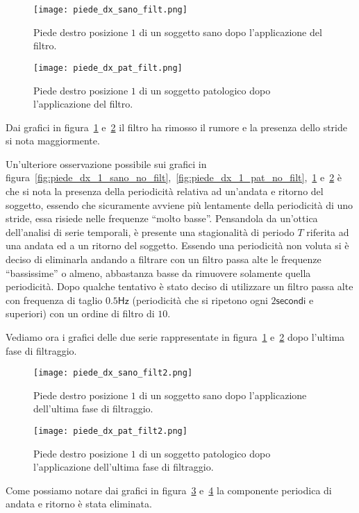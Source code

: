 \begin{figure}[H]
    \centering
    \texttt{[image: piede\_dx\_sano\_filt.png]}
    \caption{Piede destro posizione $1$ di un soggetto sano dopo l'applicazione del filtro.}
    \label{fig:piede_dx_1_sano_filt}
\end{figure}

\begin{figure}[H]
    \centering
    \texttt{[image: piede\_dx\_pat\_filt.png]}
    \caption{Piede destro posizione $1$ di un soggetto patologico dopo l'applicazione del filtro.}
    \label{fig:piede_dx_1_pat_filt}
\end{figure}

Dai grafici in figura~\ref{fig:piede_dx_1_sano_filt} 
e~\ref{fig:piede_dx_1_pat_filt} il filtro ha rimosso il rumore e la presenza dello stride
si nota maggiormente.

Un'ulteriore osservazione possibile sui grafici in figura~\ref{fig:piede_dx_1_sano_no_filt},~\ref{fig:piede_dx_1_pat_no_filt},~\ref{fig:piede_dx_1_sano_filt} 
e~\ref{fig:piede_dx_1_pat_filt} è che si nota la presenza della periodicità
relativa ad un'andata e ritorno del soggetto,
essendo che sicuramente avviene più lentamente della periodicità di uno stride, essa
risiede nelle frequenze ``molto basse''. Pensandola da un'ottica dell'analisi
di serie temporali, è presente una stagionalità di periodo $T$ riferita ad una andata
ed a un ritorno del soggetto. Essendo una periodicità non voluta si è deciso di eliminarla
andando a filtrare con un filtro passa alte le frequenze ``bassissime'' o almeno,
abbastanza basse da rimuovere solamente quella periodicità. Dopo qualche tentativo
è stato deciso di utilizzare un filtro passa alte con frequenza di taglio $0.5\mathsf{Hz}$
(periodicità che si ripetono ogni $2\mathsf{secondi}$ e superiori) con un ordine di filtro di $10$.

Vediamo ora i grafici delle due serie rappresentate in figura~\ref{fig:piede_dx_1_sano_filt} 
e~\ref{fig:piede_dx_1_pat_filt} dopo l'ultima fase di filtraggio.

\begin{figure}[H]
    \centering
    \texttt{[image: piede\_dx\_sano\_filt2.png]}
    \caption{Piede destro posizione $1$ di un soggetto sano dopo l'applicazione dell'ultima fase di filtraggio.}
    \label{fig:piede_dx_1_sano_filt2}
\end{figure}

\begin{figure}[H]
    \centering
    \texttt{[image: piede\_dx\_pat\_filt2.png]}
    \caption{Piede destro posizione $1$ di un soggetto patologico dopo l'applicazione dell'ultima fase di filtraggio.}
    \label{fig:piede_dx_1_pat_filt2}
\end{figure}

Come possiamo notare dai grafici in figura~\ref*{fig:piede_dx_1_sano_filt2} e~\ref*{fig:piede_dx_1_pat_filt2}
la componente periodica di andata e ritorno è stata eliminata.